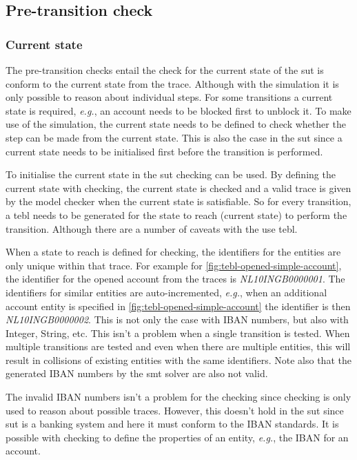 \subsection{Pre-transition check}

\subsubsection*{Current state}\label{sec:ch5-current-state}

The pre-transition checks entail the check for the current state of the \gls{sut} is
conform to the current state from the trace. Although with the simulation it is
only possible to reason about individual steps. For some transitions a current
state is required, \textit{e.g.}, an account needs to be blocked first to
unblock it. To make use of the simulation, the current state needs to be defined
to check whether the step can be made from the current state. This is also the
case in the \gls{sut} since a current state needs to be initialised first before the
transition is performed.

To initialise the current state in the \gls{sut} checking can be used. By defining
the current state with checking, the current state is checked and a valid trace
is given by the model checker when the current state is satisfiable. So for
every transition, a tebl needs to be generated for the state to reach
(current state) to perform the transition. Although there are a number of
caveats with the use tebl.

When a state to reach is defined for checking, the identifiers for the entities
are only unique within that trace. For example for
\autoref{fig:tebl-opened-simple-account}, the identifier for the opened account
from the traces is \textit{NL10INGB0000001}. The identifiers for similar
entities are auto-incremented, \textit{e.g.}, when an additional account entity
is specified in \autoref{fig:tebl-opened-simple-account} the identifier is then
\textit{NL10INGB0000002}. This is not only the case with IBAN numbers, but also
with Integer, String, etc. This isn't a problem when a single transition is
tested. When multiple transitions are tested and even when there are multiple
entities, this will result in collisions of existing entities with the same
identifiers. Note also that the generated IBAN numbers by the \gls{smt} solver are
also not valid.

The invalid IBAN numbers isn't a problem for the
checking since checking is only used to reason about possible traces. However,
this doesn't hold in the \gls{sut} since \gls{sut} is a banking system and here it must
conform to the IBAN standards. It is possible with checking to define the
properties of an entity, \textit{e.g.}, the IBAN for an account.

